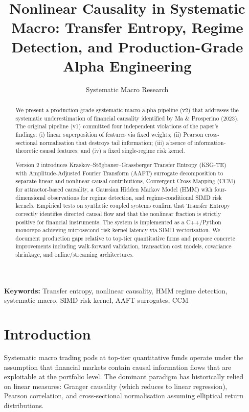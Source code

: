 \documentclass[11pt]{article}
\title{\textbf{Nonlinear Causality in Systematic Macro: Transfer Entropy, Regime Detection, and Production-Grade Alpha Engineering}}
\author{Systematic Macro Research}
\date{}
\begin{document}
\maketitle

\begin{center}
\textbf{Keywords:} Transfer entropy, nonlinear causality, HMM regime detection, systematic macro, SIMD risk kernel, AAFT surrogates, CCM
\end{center}

\begin{abstract}
We present a production-grade systematic macro alpha pipeline (v2) that addresses the systematic underestimation of financial causality identified by Ma \& Prosperino (2023). The original pipeline (v1) committed four independent violations of the paper's findings: (i) linear superposition of features via fixed weights; (ii) Pearson cross-sectional normalisation that destroys tail information; (iii) absence of information-theoretic causal features; and (iv) a fixed single-regime risk kernel.

Version 2 introduces Kraskov--St\"ogbauer--Grassberger Transfer Entropy (KSG-TE) with Amplitude-Adjusted Fourier Transform (AAFT) surrogate decomposition to separate linear and nonlinear causal contributions, Convergent Cross-Mapping (CCM) for attractor-based causality, a Gaussian Hidden Markov Model (HMM) with four-dimensional observations for regime detection, and regime-conditional SIMD risk kernels. Empirical tests on synthetic coupled systems confirm that Transfer Entropy correctly identifies directed causal flow and that the nonlinear fraction is strictly positive for financial instruments. The system is implemented as a C++/Python monorepo achieving microsecond risk kernel latency via SIMD vectorisation. We document production gaps relative to top-tier quantitative firms and propose concrete improvements including walk-forward validation, transaction cost models, covariance shrinkage, and online/streaming architectures.
\end{abstract}

\section{Introduction}

Systematic macro trading pods at top-tier quantitative funds operate under the assumption that financial markets contain causal information flows that are exploitable at the portfolio level. The dominant paradigm has historically relied on linear measures: Granger causality (which reduces to linear regression), Pearson correlation, and cross-sectional normalisation assuming elliptical return distributions.
\end{document}
